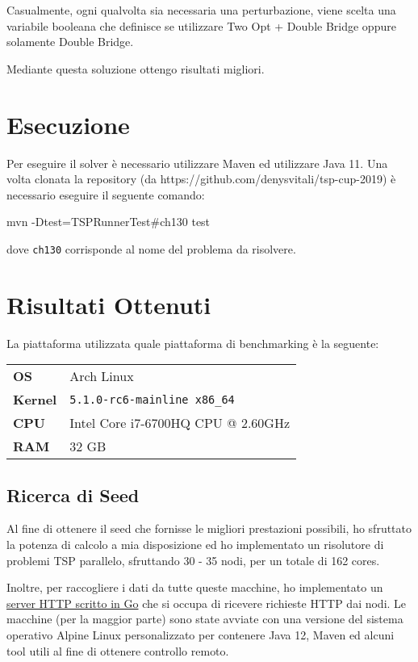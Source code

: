 \documentclass{article}
\begin{document}
Casualmente, ogni qualvolta sia necessaria una perturbazione, viene scelta una
variabile booleana che definisce se utilizzare Two Opt + Double Bridge oppure
solamente Double Bridge.

Mediante questa soluzione ottengo risultati migliori.

\pagebreak
\section{Esecuzione}
Per eseguire il solver è necessario utilizzare Maven ed utilizzare Java 11.
Una volta clonata la repository (da https://github.com/denysvitali/tsp-cup-2019)
è necessario eseguire il seguente comando:
\begin{code}
    mvn -Dtest=TSPRunnerTest#ch130 test
\end{code}
dove \texttt{ch130} corrisponde al nome del problema da risolvere.

\section{Risultati Ottenuti}
La piattaforma utilizzata quale piattaforma di benchmarking è la seguente:

\begin{tabular}{|l|l|}
    \hline
    \textbf{OS}     & Arch Linux                          \\
    \textbf{Kernel} & \texttt{5.1.0-rc6-mainline x86\_64} \\
    \textbf{CPU}    & Intel Core i7-6700HQ CPU @ 2.60GHz  \\
    \textbf{RAM}    & 32 GB                               \\
    \hline
\end{tabular}


\subsection{Ricerca di Seed}
Al fine di ottenere il seed che fornisse le migliori prestazioni possibili,
ho sfruttato la potenza di calcolo a mia disposizione ed ho implementato un
risolutore di problemi TSP parallelo, sfruttando 30 - 35 nodi, per un totale di 162 cores.

Inoltre, per raccogliere i dati da tutte queste macchine, ho implementato un
\href{https://github.com/denysvitali/tsp-node-server}{server HTTP scritto in Go} che
si occupa di ricevere richieste HTTP dai nodi. Le macchine (per la maggior parte)
sono state avviate con una versione del sistema operativo Alpine Linux
personalizzato per contenere Java 12, Maven ed alcuni tool utili al fine di ottenere
controllo remoto.
\end{document}
